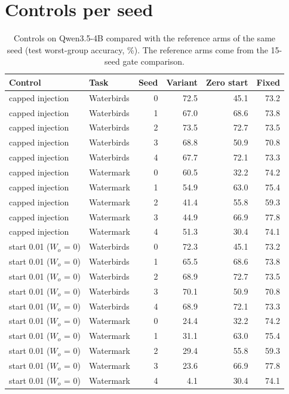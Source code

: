 \documentclass[10pt]{article}
\begin{document}
\section{Controls per seed}
\begin{longtable}{llrrrr}
\caption{Controls on Qwen3.5-4B compared with the reference arms of the same seed (test worst-group accuracy, \%). The reference arms come from the 15-seed gate comparison.}\label{tab:s-controls}\\
\toprule
Control & Task & Seed & Variant & Zero start & Fixed \\ \midrule
\endhead
capped injection & Waterbirds & 0 & 72.5 & 45.1 & 73.2 \\
capped injection & Waterbirds & 1 & 67.0 & 68.6 & 73.8 \\
capped injection & Waterbirds & 2 & 73.5 & 72.7 & 73.5 \\
capped injection & Waterbirds & 3 & 68.8 & 50.9 & 70.8 \\
capped injection & Waterbirds & 4 & 67.7 & 72.1 & 73.3 \\
capped injection & Watermark & 0 & 60.5 & 32.2 & 74.2 \\
capped injection & Watermark & 1 & 54.9 & 63.0 & 75.4 \\
capped injection & Watermark & 2 & 41.4 & 55.8 & 59.3 \\
capped injection & Watermark & 3 & 44.9 & 66.9 & 77.8 \\
capped injection & Watermark & 4 & 51.3 & 30.4 & 74.1 \\
start 0.01 ($W_o$ = 0) & Waterbirds & 0 & 72.3 & 45.1 & 73.2 \\
start 0.01 ($W_o$ = 0) & Waterbirds & 1 & 65.5 & 68.6 & 73.8 \\
start 0.01 ($W_o$ = 0) & Waterbirds & 2 & 68.9 & 72.7 & 73.5 \\
start 0.01 ($W_o$ = 0) & Waterbirds & 3 & 70.1 & 50.9 & 70.8 \\
start 0.01 ($W_o$ = 0) & Waterbirds & 4 & 68.9 & 72.1 & 73.3 \\
start 0.01 ($W_o$ = 0) & Watermark & 0 & 24.4 & 32.2 & 74.2 \\
start 0.01 ($W_o$ = 0) & Watermark & 1 & 31.1 & 63.0 & 75.4 \\
start 0.01 ($W_o$ = 0) & Watermark & 2 & 29.4 & 55.8 & 59.3 \\
start 0.01 ($W_o$ = 0) & Watermark & 3 & 23.6 & 66.9 & 77.8 \\
start 0.01 ($W_o$ = 0) & Watermark & 4 & 4.1 & 30.4 & 74.1 \\

\end{longtable}
\end{document}
